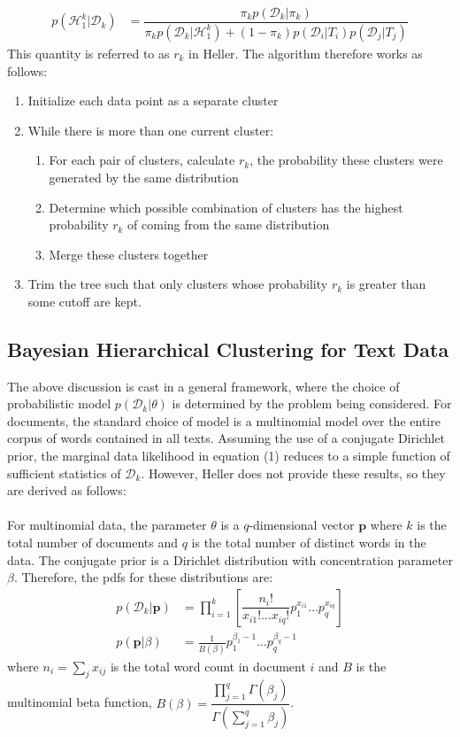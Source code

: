 \documentclass{article}
\begin{document}
\begin{align}
       p(\mathcal{H}_1^k | \mathcal{D}_k) &= \dfrac{\pi_k p(\mathcal{D}_k | \pi_k)}{\pi_k p(\mathcal{D}_k | \mathcal{H}_1^k)+(1-\pi_k)p(\mathcal{D}_i | T_i)p(\mathcal{D}_j | T_j)}
\end{align}
This quantity is referred to as $r_k$ in Heller.  The algorithm therefore works as follows:
\begin{enumerate}
\item Initialize each data point as a separate cluster
\item While there is more than one current cluster:
    \begin{enumerate}
    \item For each pair of clusters, calculate $r_k$, the probability these clusters were generated by the same distribution 
    \item Determine which possible combination of clusters has the highest probability $r_k$ of coming from the same distribution
    \item Merge these clusters together
    \end{enumerate}
\item Trim the tree such that only clusters whose probability $r_k$ is greater than some cutoff are kept.
\end{enumerate}

\subsection{Bayesian Hierarchical Clustering for Text Data}
The above discussion is cast in a general framework, where the choice of probabilistic model $p(\mathcal{D}_k|\theta)$ is determined by the problem being considered.  For documents, the standard choice of model is a multinomial model over the entire corpus of words contained in all texts.  Assuming the use of a conjugate Dirichlet prior, the marginal data likelihood in equation (1) reduces to a simple function of sufficient statistics of $\mathcal{D}_k$.  However, Heller does not provide these results, so they are derived as follows:
\\
\\
For multinomial data, the parameter $\theta$ is a $q$-dimensional vector
$\mathbf{p}$ where $k$ is the total number of documents and $q$ is the total number of distinct words in the data.  The
conjugate prior is a Dirichlet distribution with concentration
parameter $\beta$.  Therefore, the pdfs for these distributions are:
\begin{align*}
  p(\mathcal{D}_k | \mathbf{p}) &= \prod_{i=1}^k \left[\dfrac{n_i!}{x_{i1}! \dots x_{iq}!}p_1^{x_{i1}}\dots p_q^{x_{iq}}\right] \\
  p(\mathbf{p} | \beta) &= \frac{1}{B(\beta)}p_1^{\beta_1-1}\dots p_q^{\beta_q-1}
\end{align*}
where $n_i=\sum_j x_{ij}$ is the total word count in document $i$ and $B$ is the multinomial beta function, $B(\beta) =
\dfrac{\prod_{j=1}^q\Gamma(\beta_j)}{\Gamma(\sum_{j=1}^q \beta_j)}$.
\end{document}
